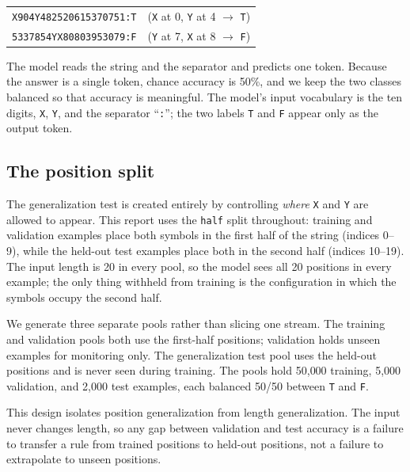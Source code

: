\documentclass{article}
\begin{document}
\begin{center}
\begin{tabular}{ll}
\texttt{X904Y482520615370751:T} & (\texttt{X} at 0, \texttt{Y} at 4 $\rightarrow$ \texttt{T}) \\
\texttt{5337854YX80803953079:F} & (\texttt{Y} at 7, \texttt{X} at 8 $\rightarrow$ \texttt{F}) \\
\end{tabular}
\end{center}

\noindent The model reads the string and the separator and predicts one token.
Because the answer is a single token, chance accuracy is 50\%, and we keep the
two classes balanced so that accuracy is meaningful. The model's input vocabulary
is the ten digits, \texttt{X}, \texttt{Y}, and the separator ``\texttt{:}''; the
two labels \texttt{T} and \texttt{F} appear only as the output token.

\subsection{The position split}\label{subsec:split}
The generalization test is created entirely by controlling \emph{where}
\texttt{X} and \texttt{Y} are allowed to appear. This report uses the \texttt{half} split
throughout: training and validation examples place both symbols in the first half
of the string (indices 0--9), while the held-out test examples place both in the
second half (indices 10--19). The input
length is 20 in every pool, so the model sees all 20 positions in every example;
the only thing withheld from training is the configuration in which the symbols
occupy the second half.

We generate three separate pools rather than slicing one
stream. The training and validation pools both use the first-half positions;
validation holds unseen examples for monitoring only. The generalization test pool uses the
held-out positions and is never seen during training. The pools hold 50{,}000
training, 5{,}000 validation, and 2{,}000 test examples, each balanced 50/50
between \texttt{T} and \texttt{F}.

This design isolates position generalization from length generalization. The
input never changes length, so any gap between validation and test accuracy is a
failure to transfer a rule from trained positions to held-out positions, not a
failure to extrapolate to unseen positions.
\end{document}
